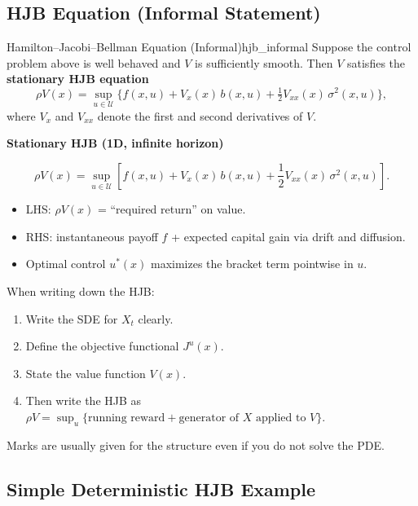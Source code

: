 \documentclass[12pt]{article}
\begin{document}
\subsection{HJB Equation (Informal Statement)}

\begin{theorem}{Hamilton--Jacobi--Bellman Equation (Informal)}{hjb_informal}
Suppose the control problem above is well behaved and $V$ is sufficiently smooth.
Then $V$ satisfies the \textbf{stationary HJB equation}
\[
  \rho V(x)
  = \sup_{u\in\mathcal{U}}
    \Big\{ f(x,u)
          + V_x(x)\,b(x,u)
          + \tfrac12 V_{xx}(x)\,\sigma^2(x,u)
    \Big\},
\]
where $V_x$ and $V_{xx}$ denote the first and second derivatives of $V$.
\end{theorem}

\begin{keyformula}
\textbf{Stationary HJB (1D, infinite horizon)}

\[
  \rho V(x)
  = \sup_{u\in\mathcal{U}}
    \left[
      f(x,u)
      + V_x(x)\,b(x,u)
      + \frac{1}{2} V_{xx}(x)\,\sigma^2(x,u)
    \right].
\]

\begin{itemize}
  \item LHS: \(\rho V(x)\) = ``required return'' on value.
  \item RHS: instantaneous payoff \(f\) + expected capital gain
        via drift and diffusion.
  \item Optimal control \(u^\ast(x)\) maximizes the bracket term pointwise in \(u\).
\end{itemize}
\end{keyformula}

\begin{examtip}
When writing down the HJB:
\begin{enumerate}
  \item Write the SDE for \(X_t\) clearly.
  \item Define the objective functional \(J^{u}(x)\).
  \item State the value function \(V(x)\).
  \item Then write the HJB as
        \(\rho V = \sup_{u}\{\text{running reward} + \text{generator of }X\text{ applied to }V\}\).
\end{enumerate}
Marks are usually given for the structure even if you do not solve the PDE.
\end{examtip}

\subsection{Simple Deterministic HJB Example}
\end{document}

